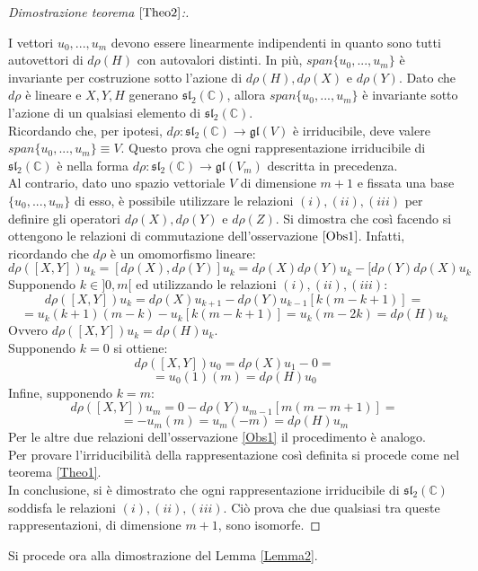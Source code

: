 \documentclass[12pt,a4paper]{report}
\theoremstyle{definition}
\theoremstyle{definition}
\theoremstyle{definition}
\theoremstyle{definition}
\begin{document}
\begin{proof}[Dimostrazione teorema $\ref{Theo2}$:]
\begin{itemize}
	\end{itemize}
I vettori $u_0,...,u_m$ devono essere linearmente indipendenti in quanto sono tutti autovettori di $d\rho(H)$ con autovalori distinti. In più, $span\{u_0,...,u_m\}$ è invariante per costruzione sotto l'azione di $d\rho(H),d\rho(X)$ e $d\rho(Y)$. Dato che $d\rho$ è lineare e $X,Y,H$ generano $\mathfrak{sl_2(\mathbb{C})}$, allora $span\{u_0,...,u_m\}$ è invariante sotto l'azione di un qualsiasi elemento di $\mathfrak{sl_2(\mathbb{C})}$.\\
Ricordando che, per ipotesi, $d\rho:\mathfrak{sl_2(\mathbb{C})}\rightarrow \mathfrak{gl}(V)$ è irriducibile, deve valere\\ $span\{u_0,...,u_m\}\equiv V$. Questo prova che ogni rappresentazione irriducibile di $\mathfrak{sl_2(\mathbb{C})}$ è nella forma $d\rho:\mathfrak{sl_2(\mathbb{C})}\rightarrow \mathfrak{gl}(V_m)$ descritta in precedenza.\\
Al contrario, dato uno spazio vettoriale $V$ di dimensione $m+1$ e fissata una base $\{u_0,...,u_m\}$ di esso, è possibile utilizzare le relazioni $(i),(ii),(iii)$ per definire gli operatori $d\rho(X),d\rho(Y)$ e $d\rho(Z)$. Si dimostra che così facendo si ottengono le relazioni di commutazione dell'osservazione $\ref{Obs1}$. Infatti, ricordando che $d\rho$ è un omomorfismo lineare:
$$d\rho([X,Y])u_k=[d\rho(X),d\rho(Y)]u_k=d\rho(X)d\rho(Y)u_k-[d\rho(Y)d\rho(X)u_k$$
Supponendo $k\in ]0,m[$ ed utilizzando le relazioni $(i),(ii),(iii)$:
$$d\rho([X,Y])u_k=d\rho(X)u_{k+1}-d\rho(Y)u_{k-1}[k(m-k+1)]=$$
$$=u_k(k+1)(m-k)-u_k[k(m-k+1)]=u_k(m-2k)=d\rho(H)u_k$$
Ovvero $d\rho([X,Y])u_k=d\rho(H)u_k$.\\
Supponendo $k=0$ si ottiene: $$d\rho([X,Y])u_0=d\rho(X)u_{1}-0=$$
$$=u_0(1)(m)=d\rho(H)u_0$$
Infine, supponendo $k=m$:
$$d\rho([X,Y])u_m=0-d\rho(Y)u_{m-1}[m(m-m+1)]=$$
$$=-u_m(m)=u_m(-m)=d\rho(H)u_m$$
Per le altre due relazioni dell'osservazione \ref{Obs1} il procedimento è analogo.\\
Per provare l'irriducibilità della rappresentazione così definita si procede come nel teorema \ref{Theo1}.\\
In conclusione, si è dimostrato che ogni rappresentazione irriducibile di $\mathfrak{sl_2(\mathbb{C})}$ soddisfa le relazioni $(i),(ii),(iii)$. Ciò prova che due qualsiasi tra queste rappresentazioni, di dimensione $m+1$, sono isomorfe.
\end{proof}
Si procede ora alla dimostrazione del Lemma \ref{Lemma2}.
\end{document}
